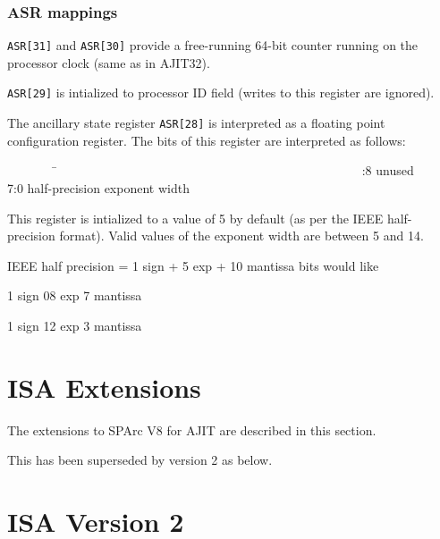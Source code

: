 \documentclass{book}
\begin{document}
\subsubsection{ASR mappings}
\label{sec:asr:mappings}


\texttt{ASR[31]} and \texttt{ASR[30]}  provide a free-running 64-bit counter
running on the processor clock (same as in AJIT32).

\texttt{ASR[29]} is intialized to processor ID field (writes to this
register are ignored).

The ancillary  state register \texttt{ASR[28]}  is interpreted
as a floating point configuration  register.  The bits of this
register are interpreted as follows:
\begin{tabbing}
  ~~~~~~~~\=~~~~~~~~~~~~~~~~~~~~~~~~~~~~~~~~~~~~~~~~~~~~~~~~ :8 \> unused \\
  7:0  \>  half-precision exponent width
\end{tabbing}
This register is intialized to a value of 5 by default (as
per the IEEE half-precision format).  Valid values of the
exponent width are between 5 and 14.

IEEE half precision = 1 sign + 5 exp + 10 mantissa bits
would like\\ 		
\centerline{1 sign 08 exp 7 mantissa}
\centerline{1 sign 12 exp 3 mantissa}

\newpage
\section{ISA Extensions}
\label{sec:isa:extns}

The extensions to SPArc V8 for AJIT are described in this section.

% 
This has been superseded by version 2 as below.

\section{ISA Version 2}
\label{sec:isa:v2}



\newpage



\newpage

\end{document}
